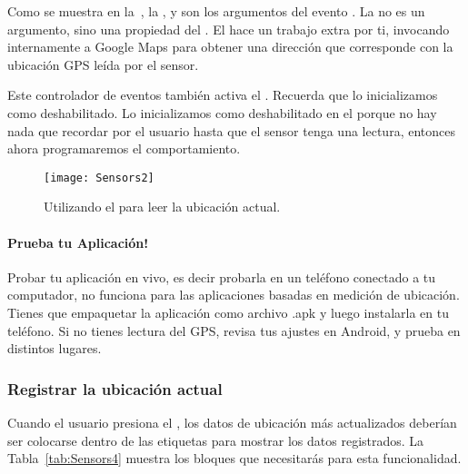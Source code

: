 Como se muestra en la~,
la ,  y  son
los argumentos del evento . La
 no es un argumento, sino una propiedad del
. El  hace
un trabajo extra por ti, invocando internamente a Google Maps para
obtener una dirección que corresponde con la ubicación GPS leída por
el sensor.

Este controlador de eventos también activa el
. Recuerda que lo inicializamos como
deshabilitado. Lo inicializamos como deshabilitado en el
\componentDesigner porque no hay nada que recordar por el usuario
hasta que el sensor tenga una lectura, entonces ahora programaremos el
comportamiento.

\begin{figure}[H]
\centering
\texttt{[image: Sensors2]}
\caption{Utilizando el  para leer la ubicación actual.}
\label{fig:Sensors2}
\end{figure}

\paragraph{Prueba tu Aplicación!} Probar tu aplicación en vivo, es
decir probarla en un teléfono conectado a tu computador, no funciona
para las aplicaciones basadas en medición de ubicación. Tienes que
empaquetar la aplicación como archivo .apk y luego instalarla en tu
teléfono. Si no tienes lectura del GPS, revisa tus ajustes en Android,
y prueba en distintos lugares.

\subsubsection*{Registrar la ubicación actual}

Cuando el usuario presiona el , los datos de
ubicación más actualizados deberían ser colocarse dentro de las
etiquetas para mostrar los datos registrados. La
Tabla~\ref{tab:Sensors4} muestra los bloques que necesitarás para esta
funcionalidad.

